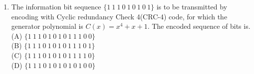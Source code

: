 \documentclass{article}
\begin{document}
\begin{enumerate}
\item 
The information bit sequence $\{1\ 1\ 1\ 0\ 1\ 0\ 1\ 0\ 1\}$ is to be transmitted by encoding with Cyclic redundancy Check 4(CRC-4) code, for which the generator polynomial is  $ C(x) = x^4 + x + 1 $. The encoded sequence of bits is\underline{\hspace{2cm}}.\\

(A) $\{1\ 1\ 1\ 0\ 1\ 0\ 1\ 0\ 1\ 1\ 1\ 0\ 0\}$\\
(B) $\{1\ 1\ 1\ 0\ 1\ 0\ 1\ 0\ 1\ 1\ 1\ 0\ 1\}$\\
(C) $\{1\ 1\ 1\ 0\ 1\ 0\ 1\ 0\ 1\ 1\ 1\ 1\ 0\}$\\
(D) $\{1\ 1\ 1\ 0\ 1\ 0\ 1\ 0\ 1\ 0\ 1\ 0\ 0\}$\\
\end{enumerate}
\end{document}
